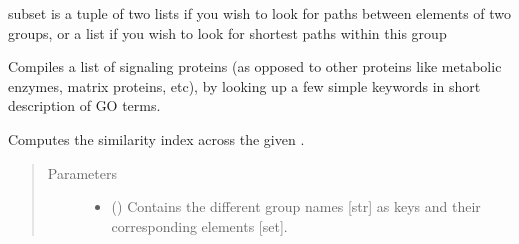\documentclass[letterpaper,10pt,english]{sphinxmanual}
\begin{document}
\begin{fulllineitems}
\begin{fulllineitems}
\begin{quote}
\begin{description}
\end{description}\end{quote}

\end{fulllineitems}


\begin{fulllineitems}
\label{\detokenize{main:pypath.main.PyPath.shortest_path_dist}}
subset is a tuple of two lists if you wish to look for
paths between elements of two groups, or a list if you
wish to look for shortest paths within this group

\end{fulllineitems}


\begin{fulllineitems}
\label{\detokenize{main:pypath.main.PyPath.signaling_proteins_list}}
Compiles a list of signaling proteins (as opposed to other
proteins like metabolic enzymes, matrix proteins, etc), by
looking up a few simple keywords in short description of GO
terms.

\end{fulllineitems}


\begin{fulllineitems}
\label{\detokenize{main:pypath.main.PyPath.signor_pathways}}
\end{fulllineitems}


\begin{fulllineitems}
\label{\detokenize{main:pypath.main.PyPath.similarity_groups}}
Computes the similarity index across the given .
\begin{quote}\begin{description}
\item[{Parameters}] \leavevmode\begin{itemize}
\item {} 
 () \textendash{} Contains the different group names {[}str{]} as keys and their
corresponding elements {[}set{]}.


\end{itemize}
\end{description}
\end{quote}
\end{fulllineitems}
\end{fulllineitems}
\end{document}
